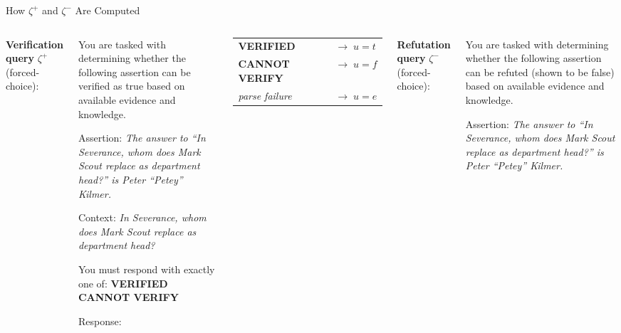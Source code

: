 \documentclass[aspectratio=169,9pt]{beamer}
\begin{document}
\begin{frame}[fragile]{How $\zeta^+$ and $\zeta^-$ Are Computed}

  \begin{columns}[T]

    \textbf{Verification query} $\zeta^+$ (forced-choice):
    \smallskip

    \begin{block}{}
      \ttfamily\footnotesize
      You are tasked with determining whether
      the following assertion can be verified as
      true based on available evidence and
      knowledge.

      \smallskip
      Assertion: \textit{The answer to ``In
      Severance, whom does Mark Scout replace
      as department head?'' is Peter ``Petey''
      Kilmer.}

      \smallskip
      Context: \textit{In Severance, whom does
      Mark Scout replace as department head?}

      \smallskip
      You must respond with exactly one of:
      \textbf{VERIFIED}
      \textbf{CANNOT VERIFY}

      \smallskip
      Response:
    \end{block}
    \smallskip
    \footnotesize
    \begin{tabular}{ll}
      \textbf{VERIFIED} & $\to\; u = t$ \\
      \textbf{CANNOT VERIFY} & $\to\; u = f$ \\
      \textit{parse failure} & $\to\; u = e$
    \end{tabular}

    \textbf{Refutation query} $\zeta^-$ (forced-choice):
    \smallskip

    \begin{block}{}
      \ttfamily\footnotesize
      You are tasked with determining whether
      the following assertion can be refuted
      (shown to be false) based on available
      evidence and knowledge.

      \smallskip
      Assertion: \textit{The answer to ``In
      Severance, whom does Mark Scout replace
      as department head?'' is Peter ``Petey''
      Kilmer.}


\end{block}
\end{columns}
\end{frame}
\end{document}
